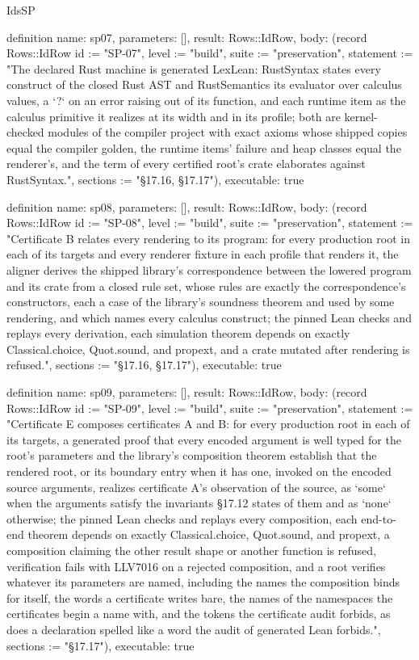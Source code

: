 \begin{lexlean}{IdsSP}
\begin{semanticmodule}
definition{
  name: sp07,
  parameters: [],
  result: Rows::IdRow,
  body: (record Rows::IdRow {id := "SP-07", level := "build", suite := "preservation", statement := "The declared Rust machine is generated LexLean: RustSyntax states every construct of the closed Rust AST and RustSemantics its evaluator over calculus values, a `?` on an error raising out of its function, and each runtime item as the calculus primitive it realizes at its width and in its profile; both are kernel-checked modules of the compiler project with exact axioms whose shipped copies equal the compiler golden, the runtime items' failure and heap classes equal the renderer's, and the term of every certified root's crate elaborates against RustSyntax.", sections := "§17.16, §17.17"}),
  executable: true
}

definition{
  name: sp08,
  parameters: [],
  result: Rows::IdRow,
  body: (record Rows::IdRow {id := "SP-08", level := "build", suite := "preservation", statement := "Certificate B relates every rendering to its program: for every production root in each of its targets and every renderer fixture in each profile that renders it, the aligner derives the shipped library's correspondence between the lowered program and its crate from a closed rule set, whose rules are exactly the correspondence's constructors, each a case of the library's soundness theorem and used by some rendering, and which names every calculus construct; the pinned Lean checks and replays every derivation, each simulation theorem depends on exactly Classical.choice, Quot.sound, and propext, and a crate mutated after rendering is refused.", sections := "§17.16, §17.17"}),
  executable: true
}

definition{
  name: sp09,
  parameters: [],
  result: Rows::IdRow,
  body: (record Rows::IdRow {id := "SP-09", level := "build", suite := "preservation", statement := "Certificate E composes certificates A and B: for every production root in each of its targets, a generated proof that every encoded argument is well typed for the root's parameters and the library's composition theorem establish that the rendered root, or its boundary entry when it has one, invoked on the encoded source arguments, realizes certificate A's observation of the source, as `some` when the arguments satisfy the invariants §17.12 states of them and as `none` otherwise; the pinned Lean checks and replays every composition, each end-to-end theorem depends on exactly Classical.choice, Quot.sound, and propext, a composition claiming the other result shape or another function is refused, verification fails with LLV7016 on a rejected composition, and a root verifies whatever its parameters are named, including the names the composition binds for itself, the words a certificate writes bare, the names of the namespaces the certificates begin a name with, and the tokens the certificate audit forbids, as does a declaration spelled like a word the audit of generated Lean forbids.", sections := "§17.17"}),
  executable: true
}


\end{semanticmodule}
\end{lexlean}
